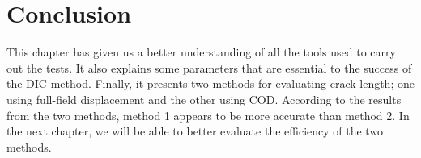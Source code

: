\section{Conclusion}

This chapter has given us a better understanding of all the tools used to carry out the tests. It also explains some parameters that are essential to the success of the DIC method. Finally, it presents two methods for evaluating crack length; one using full-field displacement and the other using COD.
According to the results from the two methods, method 1 appears to be more accurate than method 2. In the next chapter, we will be able to better evaluate the efficiency of the two methods.


